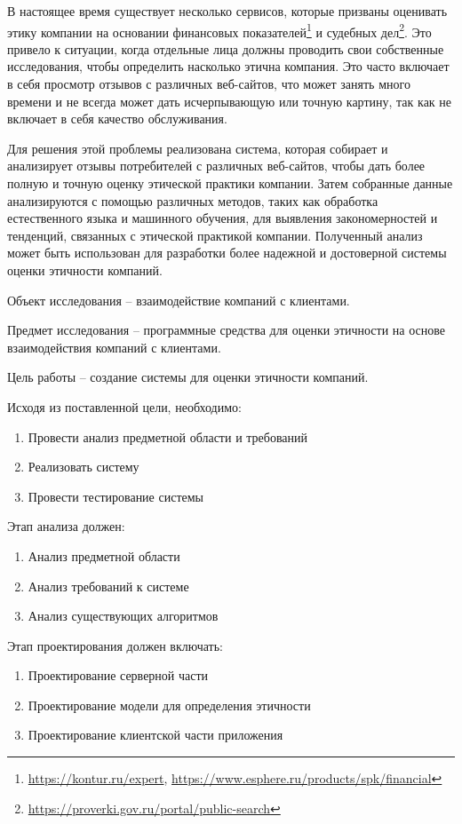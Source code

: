 \documentclass[PI, VKR]{HSEUniversity}
\begin{document}
В настоящее время существует несколько сервисов, которые призваны оценивать этику компании на основании финансовых показателей\footnote{\url{https://kontur.ru/expert}, \url{https://www.esphere.ru/products/spk/financial}} и судебных дел\footnote{\url{https://proverki.gov.ru/portal/public-search}}. Это привело к ситуации, когда отдельные лица должны проводить свои собственные исследования, чтобы определить насколько этична компания. Это часто включает в себя просмотр отзывов с различных веб-сайтов, что может занять много времени и не всегда может дать исчерпывающую или точную картину, так как не включает в себя качество обслуживания.

Для решения этой проблемы реализована система, которая собирает и анализирует отзывы потребителей с различных веб-сайтов, чтобы дать более полную и точную оценку этической практики компании. Затем собранные данные анализируются с помощью различных методов, таких как обработка естественного языка и машинного обучения, для выявления закономерностей и тенденций, связанных с этической практикой компании. Полученный анализ может быть использован для разработки более надежной и достоверной системы оценки этичности компаний.

Объект исследования – взаимодействие компаний с клиентами.

Предмет исследования – программные средства для оценки этичности на основе взаимодействия компаний с клиентами.

Цель работы – создание системы для оценки этичности компаний.

Исходя из поставленной цели, необходимо:

\begin{enumerate}
\item Провести анализ предметной области и требований
\item Реализовать систему
\item Провести тестирование системы
\end{enumerate}

Этап анализа должен:
\begin{enumerate}
\item Анализ предметной области
\item Анализ требований к системе
\item Анализ существующих алгоритмов
\end{enumerate}

Этап проектирования должен включать:
\begin{enumerate}
\item Проектирование серверной части
\item Проектирование модели для определения этичности
\item Проектирование клиентской части приложения
\end{enumerate}
\end{document}
